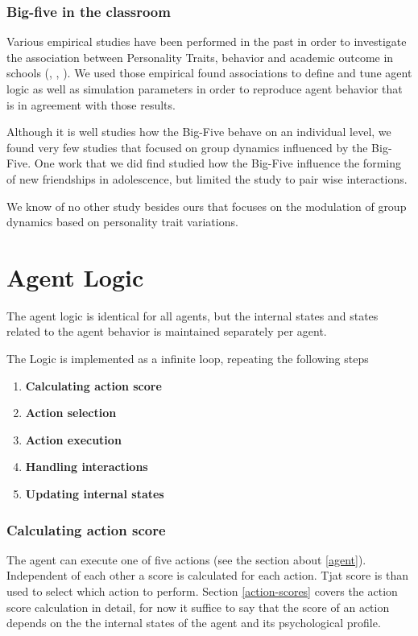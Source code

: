 \subsubsection{Big-five in the classroom}
Various empirical studies have been performed in the past in order to investigate
the association between Personality Traits, behavior and academic outcome in schools
(\cite{Ehrler1999}, \cite{Nigg2002}, \cite{Asendorpf2003}).
We used those empirical found associations to define and tune agent logic as well
as simulation parameters in order to reproduce agent behavior that is in agreement
with those results.

Although it is well studies how the Big-Five behave on an individual level, we
found very few studies that focused on group dynamics influenced by the
Big-Five. One work that we did find\cite{Selfhout2010} studied how the Big-Five
influence the forming of new friendships in adolescence, but limited the study
to pair wise interactions.

We know of no other study besides ours that focuses on the modulation of group
dynamics based on personality trait variations.

\section{Agent Logic}
The agent logic is identical for all agents, but the internal states and
states related to the agent behavior is maintained separately per agent.

The Logic is implemented as a infinite loop, repeating the following steps

\begin{enumerate}
    \item \textbf{Calculating action score}
    \item \textbf{Action selection}
    \item \textbf{Action execution}
    \item \textbf{Handling interactions}
    \item \textbf{Updating internal states}
\end{enumerate}

\subsubsection{Calculating action score}
The agent can execute one of five actions (see the section about \ref{agent}).
Independent of each other a score is calculated for each action. Tjat score is than
used to select which action to perform. Section \ref{action-scores} covers the
action score calculation in detail, for now it suffice to say that the score of
an action depends on the the internal states of the agent and its psychological
profile.

